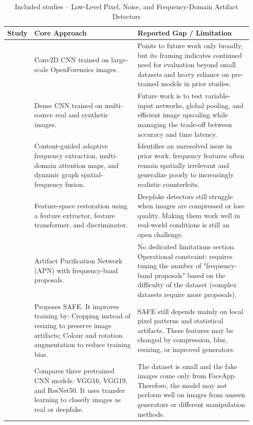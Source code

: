 \documentclass[sn-mathphys-num,Numbered,pdflatex]{sn-jnl}
\begin{document}
\begin{table}[htbp]
\caption{Included studies -- Low-Level Pixel, Noise, and Frequency-Domain Artifact Detectors}
\label{tab:frequency_spatial}
\centering\footnotesize
\begin{tabularx}{\columnwidth}{@{}p{} X X@{}}
\toprule
\textbf{Study} & \textbf{Core Approach} & \textbf{Reported Gap / Limitation} \\
\midrule
\cite{DeepfakeImage9} & Conv2D CNN trained on large-scale OpenForensics images. & Points to future work only broadly, but its framing indicates continued need for evaluation beyond small datasets and heavy reliance on pre-trained models in prior studies. \\
\cite{AnImproved10} & Dense CNN trained on multi-source real and synthetic images. & Future work is to test variable-input networks, global pooling, and efficient image upscaling while managing the trade-off between accuracy and time latency. \\
\cite{DynamicGraph17} & Content-guided adaptive frequency extraction, multi-domain attention maps, and dynamic graph spatial-frequency fusion. & Identifies an unresolved issue in prior work: frequency features often remain spatially irrelevant and generalize poorly to increasingly realistic counterfeits. \\
\cite{DfudetectorAn18} & Feature-space restoration using a feature extractor, feature transformer, and discriminator. & Deepfake detectors still struggle when images are compressed or lose quality. Making them work well in real-world conditions is still an open challenge. \\
\cite{ArtifactFeature20} & Artifact Purification Network (APN) with frequency-band proposals. & No dedicated limitations section. Operational constraint: requires tuning the number of "frequency-band proposals" based on the difficulty of the dataset (complex datasets require more proposals). \\
\cite{ImprovingSynthetic24} & Proposes SAFE. It improves training by: Cropping instead of resizing to preserve image artifacts; Colour and rotation augmentation to reduce training bias. & SAFE still depends mainly on local pixel patterns and statistical artifacts. These features may be changed by compression, blur, resizing, or improved generators. \\
\cite{ComparativeAnalysis27} & Compares three pretrained CNN models: VGG16, VGG19, and ResNet50. It uses transfer learning to classify images as real or deepfake. & The dataset is small and the fake images come only from FaceApp. Therefore, the model may not perform well on images from unseen generators or different manipulation methods. \\

\end{tabularx}
\end{table}
\end{document}
